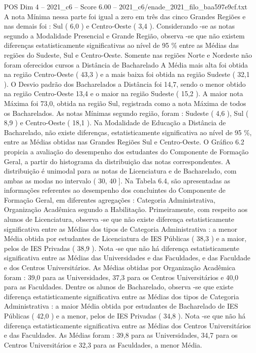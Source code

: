 \begin{textsample}{POS Dim 4 – 2021\_c6 – Score 6.00 – 2021\_c6/enade\_2021\_filo\_baa597e9cf.txt}
A nota Mínima nessa parte foi igual a zero em três das cinco Grandes Regiões e nas demais foi : Sul ( 6,0 ) e Centro-Oeste ( 3,4 ).
Considerando -se as notas segundo a Modalidade Presencial e Grande Região, observa -se que não existem diferenças estatisticamente significativas ao nível de 95 \% entre as Médias das regiões do Sudeste, Sul e Centro-Oeste.
Somente nas regiões Norte e Nordeste não foram oferecidos cursos a Distância de Bacharelado A Média mais alta foi obtida na região Centro-Oeste ( 43,3 ) e a mais baixa foi obtida na região Sudeste ( 32,1 ).
O Desvio padrão dos Bacharelados a Distância foi 14,7, sendo o menor obtido na região Centro-Oeste 13,4 e o maior na região Sudeste ( 15,2 ).
A maior nota Máxima foi 73,0, obtida na região Sul, registrada como a nota Máxima de todos os Bacharelados.
As notas Mínimas segundo região, foram : Sudeste ( 4,6 ), Sul ( 8,9 ) e Centro-Oeste ( 18,1 ).
Na Modalidade de Educação a Distância de Bacharelado, não existe diferenças, estatisticamente significativa ao nível de 95 \%, entre as Médias obtidas nas Grandes Regiões Sul e Centro-Oeste.
O Gráfico 6.2 propicia a avaliação do desempenho dos estudantes do Componente de Formação Geral, a partir do histograma da distribuição das notas correspondentes.
A distribuição é unimodal para as notas de Licenciatura e de Bacharelado, com ambas as modas no intervalo ( 30, 40 ].
Na Tabela 6.4, são apresentadas as informações referentes ao desempenho dos concluintes do Componente de Formação Geral, em diferentes agregações : Categoria Administrativa, Organização Acadêmica segundo a Habilitação.
Primeiramente, com respeito aos alunos de Licenciatura, observa -se que não existe diferença estatisticamente significativa entre as Médias dos tipos de Categoria Administrativa : a menor Média obtida por estudantes de Licenciatura de IES Públicas ( 38,3 ) e a maior, pelos de IES Privadas ( 38,9 ).
Nota -se que não há diferença estatisticamente significativa entre as Médias das Universidades e das Faculdades, e das Faculdade e dos Centros Universitários.
As Médias obtidas por Organização Acadêmica foram : 39,0 para as Universidades, 37,3 para os Centros Universitários e 40,0 para as Faculdades.
Dentre os alunos de Bacharelado, observa -se que existe diferença estatisticamente significativa entre as Médias dos tipos de Categoria Administrativa : a maior Média obtida por estudantes de Bacharelado de IES Públicas ( 42,0 ) e a menor, pelos de IES Privadas ( 34,8 ).
Nota -se que não há diferença estatisticamente significativa entre as Médias dos Centros Universitários e das Faculdades.
As Médias foram : 39,8 para as Universidades, 34,7 para os Centros Universitários e 32,3 para as Faculdades, a menor Média.

\end{textsample}

